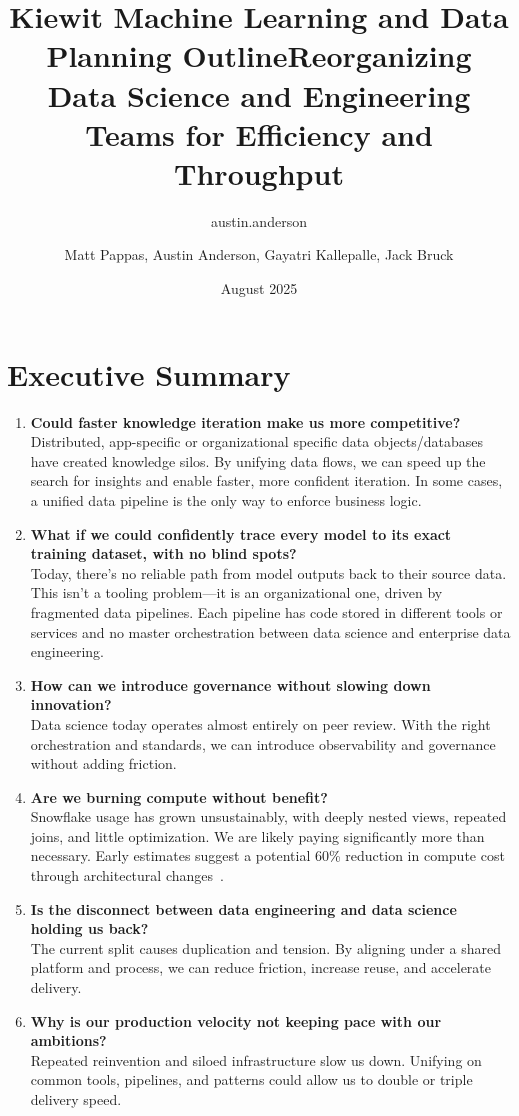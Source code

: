 \documentclass{article}
\title{Kiewit Machine Learning and Data Planning Outline}
\author{austin.anderson }
\date{August 2025}
\title{Reorganizing Data Science and Engineering Teams for Efficiency and Throughput}
\author{Matt Pappas, Austin Anderson, Gayatri Kallepalle, Jack Bruck}
\date{}
\begin{document}
\maketitle
 
\section{Executive Summary}

\begin{enumerate}[leftmargin=1.5em,label=\arabic*.]
    \item \textbf{Could faster knowledge iteration make us more competitive?} \\
    Distributed, app-specific or organizational specific data objects/databases have created knowledge silos. By unifying data flows, we can speed up the search for insights and enable faster, more confident iteration.  In some cases, a unified data pipeline is the only way to enforce business logic.

    \item \textbf{What if we could confidently trace every model to its exact training dataset, with no blind spots?} \\
    Today, there’s no reliable path from model outputs back to their source data. This isn’t a tooling problem—it is an organizational one, driven by fragmented data pipelines.  Each pipeline has code stored in different tools or services and no master orchestration between data science and enterprise data engineering.

    \item \textbf{How can we introduce governance without slowing down innovation?} \\
    Data science today operates almost entirely on peer review. With the right orchestration and standards, we can introduce observability and governance without adding friction.
    
    \item \textbf{Are we burning compute without benefit?} \\
    Snowflake usage has grown unsustainably, with deeply nested views, repeated joins, and little optimization. We are likely paying significantly more than necessary. Early estimates suggest a potential 60\% reduction in compute cost through architectural changes~\cite{helios2025}.

    \item \textbf{Is the disconnect between data engineering and data science holding us back?} \\
    The current split causes duplication and tension. By aligning under a shared platform and process, we can reduce friction, increase reuse, and accelerate delivery.

    \item \textbf{Why is our production velocity not keeping pace with our ambitions?} \\
    Repeated reinvention and siloed infrastructure slow us down. Unifying on common tools, pipelines, and patterns could allow us to double or triple delivery speed.
\end{enumerate}
\end{document}
